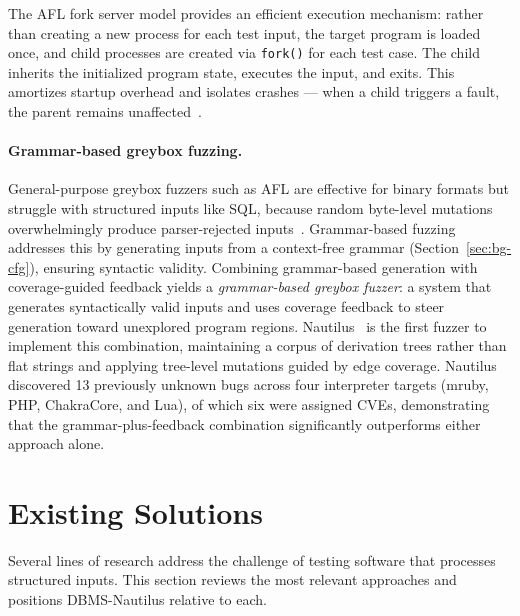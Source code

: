 The AFL fork server model provides an efficient execution mechanism: rather than creating a new process for each test input, the target program is loaded once, and child processes are created via \texttt{fork()} for each test case. The child inherits the initialized program state, executes the input, and exits. This amortizes startup overhead and isolates crashes --- when a child triggers a fault, the parent remains unaffected~\citep{afl}.

\paragraph{Grammar-based greybox fuzzing.}
General-purpose greybox fuzzers such as AFL are effective for binary formats but struggle with structured inputs like SQL, because random byte-level mutations overwhelmingly produce parser-rejected inputs~\citep{nautilus}. Grammar-based fuzzing addresses this by generating inputs from a context-free grammar (Section~\ref{sec:bg-cfg}), ensuring syntactic validity. Combining grammar-based generation with coverage-guided feedback yields a \textit{grammar-based greybox fuzzer}: a system that generates syntactically valid inputs and uses coverage feedback to steer generation toward unexplored program regions. Nautilus~\citep{nautilus} is the first fuzzer to implement this combination, maintaining a corpus of derivation trees rather than flat strings and applying tree-level mutations guided by edge coverage. Nautilus discovered 13 previously unknown bugs across four interpreter targets (mruby, PHP, ChakraCore, and Lua), of which six were assigned CVEs, demonstrating that the grammar-plus-feedback combination significantly outperforms either approach alone.


\section{Existing Solutions}
\label{sec:bg-related}

Several lines of research address the challenge of testing software that processes structured inputs. This section reviews the most relevant approaches and positions DBMS-Nautilus relative to each.

